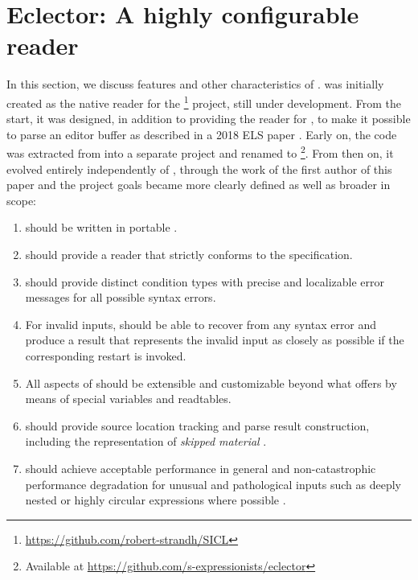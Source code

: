 \section{Eclector: A highly configurable reader}
\label{sec-eclector}

In this section, we discuss features and other characteristics of
\eclector{}.  \eclector{} was initially created as the native reader
for the \sicl{}%
\footnote{\url{https://github.com/robert-strandh/SICL}} project, still
under development.  From the start, it was designed, in addition to
providing the reader for \sicl{}, to make it possible to parse an
editor buffer as described in a 2018 ELS paper
\cite{durand:hal-01887230}.  Early on, the code was extracted from
\sicl{} into a separate project and renamed to
\eclector{}\footnote{Available at
  \url{https://github.com/s-expressionists/eclector}}.  From then on,
it evolved entirely independently of \sicl{}, through the work of the
first author of this paper and the project goals became more clearly
defined as well as broader in scope:

\begin{enumerate}
\item \eclector{} should be written in portable \cl{}.
\item \eclector{} should provide a reader that strictly conforms to
  the \cl{} specification.
\item \eclector{} should provide distinct condition types with precise
  and localizable error messages for all possible syntax errors.
\item For invalid inputs, \eclector{} should be able to recover from
  any syntax error and produce a result that represents the invalid
  input as closely as possible if the corresponding restart is
  invoked.
\item All aspects of \eclector{} should be extensible and customizable
  beyond what \cl{} offers by means of special variables and
  readtables.
\item \eclector{} should provide source location tracking and parse
  result construction, including the representation of \emph{skipped
  material} .
\item \eclector{} should achieve acceptable performance in general
   and non-catastrophic performance degradation
  for unusual and pathological inputs such as deeply nested or highly
  circular expressions where possible
  .
\end{enumerate}

